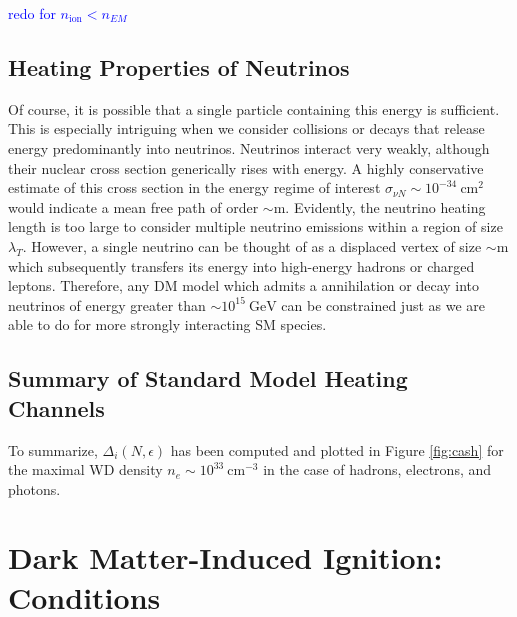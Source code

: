 \documentclass[twocolumn,showpacs,preprintnumbers,amsmath,amssymb,prd]{revtex4}
\begin{document}
\textcolor{blue}{redo for $n_\text{ion} < n_{EM}$}

\subsection{Heating Properties of Neutrinos}

Of course, it is possible that a single particle containing this energy is sufficient.
This is especially intriguing when we consider collisions or decays that release energy predominantly into neutrinos.
Neutrinos interact very weakly, although their nuclear cross section generically rises with energy.
A highly conservative estimate of this cross section in the energy regime of interest $\sigma_{\nu N} \sim 10^{-34} ~\text{cm}^2$ would indicate a mean free path of order $\sim \text{m}$.
Evidently, the neutrino heating length is too large to consider multiple neutrino emissions within a region of size $\lambda_T$.
However, a single neutrino can be thought of as a displaced vertex of size $\sim \text{m}$ which subsequently transfers its energy into high-energy hadrons or charged leptons.
Therefore, any DM model which admits a annihilation or decay into neutrinos of energy greater than $\sim 10^{15} ~\text{GeV}$ can be constrained just as we are able to do for more strongly interacting SM species.

\subsection{Summary of Standard Model Heating Channels}

To summarize, $\Delta_i(N,\epsilon)$ has been computed and plotted in Figure \ref{fig:cash} for the maximal WD density $n_e \sim 10^{33} ~\text{cm}^{-3}$ in the case of hadrons, electrons, and photons.

\section{Dark Matter-Induced Ignition: Conditions}
\label{sec:DMexplode}
\end{document}
